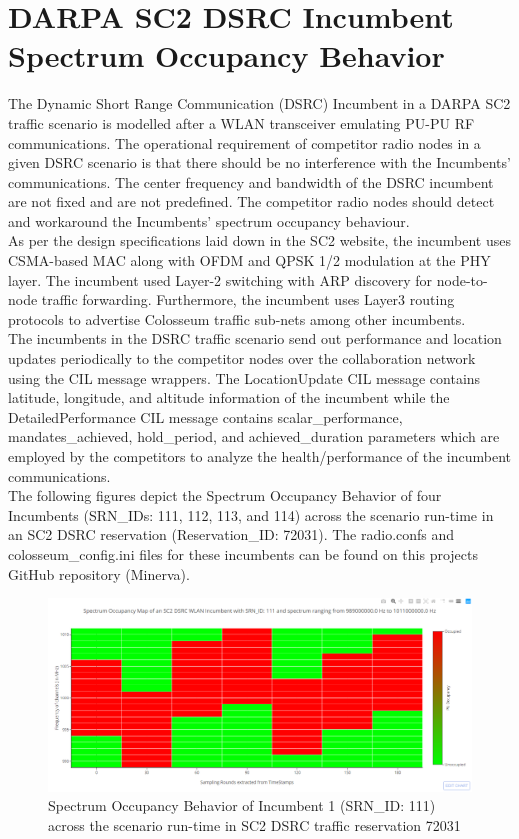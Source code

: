 \documentclass[12pt, draftcls, onecolumn]{IEEEtran}
\begin{document}
\section{DARPA SC2 DSRC Incumbent Spectrum Occupancy Behavior}
The Dynamic Short Range Communication (DSRC) Incumbent in a DARPA SC2 traffic scenario is modelled after a WLAN transceiver emulating PU-PU RF communications. The operational requirement of competitor radio nodes in a given DSRC scenario is that there should be no interference with the Incumbents' communications. The center frequency and bandwidth of the DSRC incumbent are not fixed and are not predefined. The competitor radio nodes should detect and workaround the Incumbents' spectrum occupancy behaviour.
\\As per the design specifications laid down in the SC2 website, the incumbent uses CSMA-based MAC along with OFDM and QPSK 1/2 modulation at the PHY layer. The incumbent used Layer-2 switching with ARP discovery for node-to-node traffic forwarding. Furthermore, the incumbent uses Layer3 routing protocols to advertise Colosseum traffic sub-nets among other incumbents.
\\The incumbents in the DSRC traffic scenario send out performance and location updates periodically to the competitor nodes over the collaboration network using the CIL message wrappers. The LocationUpdate CIL message contains latitude, longitude, and altitude information of the incumbent while the DetailedPerformance CIL message contains scalar\_performance, mandates\_achieved, hold\_period, and achieved\_duration parameters which are employed by the competitors to analyze the health/performance of the incumbent communications.
\\The following figures depict the Spectrum Occupancy Behavior of four Incumbents (SRN\_IDs: 111, 112, 113, and 114) across the scenario run-time in an SC2 DSRC reservation (Reservation\_ID: 72031). The radio.confs and colosseum\_config.ini files for these incumbents can be found on this projects GitHub repository (Minerva).
\begin{figure}[t]
\includegraphics[width=1.0\textwidth]{Spectrum_Occupancy_DARPA_SC2_Incumbent_WLAN_DSRC_SRN_111.png}
\caption{Spectrum Occupancy Behavior of Incumbent 1 (SRN\_ID: 111) across the scenario run-time in SC2 DSRC traffic reservation 72031}
\label{fig:mesh12}
\centering
\end{figure}
\end{document}
